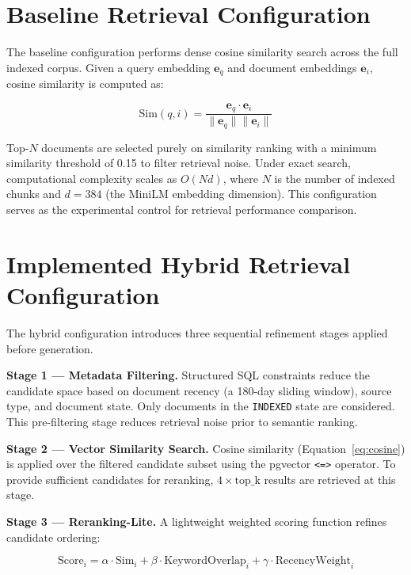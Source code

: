\documentclass[12pt,a4paper]{report}
\begin{document}
\section{Baseline Retrieval Configuration}
\label{sec:baseline}

The baseline configuration performs dense cosine similarity search across the full indexed corpus. Given a query embedding $\mathbf{e}_q$ and document embeddings $\mathbf{e}_i$, cosine similarity is computed as:

\begin{equation}
  \text{Sim}(q, i) = \frac{\mathbf{e}_q \cdot \mathbf{e}_i}{\|\mathbf{e}_q\|\|\mathbf{e}_i\|}
  \label{eq:cosine}
\end{equation}

Top-$N$ documents are selected purely on similarity ranking with a minimum similarity threshold of 0.15 to filter retrieval noise. Under exact search, computational complexity scales as $O(Nd)$, where $N$ is the number of indexed chunks and $d = 384$ (the MiniLM embedding dimension). This configuration serves as the experimental control for retrieval performance comparison.

\section{Implemented Hybrid Retrieval Configuration}
\label{sec:hybrid}

The hybrid configuration introduces three sequential refinement stages applied before generation.

\textbf{Stage 1 --- Metadata Filtering.} Structured SQL constraints reduce the candidate space based on document recency (a 180-day sliding window), source type, and document state. Only documents in the \texttt{INDEXED} state are considered. This pre-filtering stage reduces retrieval noise prior to semantic ranking.

\textbf{Stage 2 --- Vector Similarity Search.} Cosine similarity (Equation~\ref{eq:cosine}) is applied over the filtered candidate subset using the pgvector \texttt{<=>} operator. To provide sufficient candidates for reranking, $4 \times \text{top\_k}$ results are retrieved at this stage.

\textbf{Stage 3 --- Reranking-Lite.} A lightweight weighted scoring function refines candidate ordering:

\begin{equation}
  \text{Score}_i = \alpha \cdot \text{Sim}_i + \beta \cdot \text{KeywordOverlap}_i + \gamma \cdot \text{RecencyWeight}_i
  \label{eq:reranking}
\end{equation}
\end{document}
